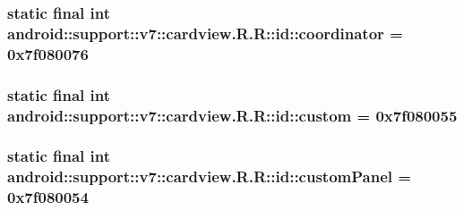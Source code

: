 \hypertarget{classandroid_1_1support_1_1v7_1_1cardview_1_1_r_1_1id_79f3959773ea30c0c7591179754d365b}{
\subsubsection[{coordinator}]{\setlength{\rightskip}{0pt plus 5cm}static final int android::support::v7::cardview.R.R::id::coordinator = 0x7f080076}}
\label{classandroid_1_1support_1_1v7_1_1cardview_1_1_r_1_1id_79f3959773ea30c0c7591179754d365b}


\hypertarget{classandroid_1_1support_1_1v7_1_1cardview_1_1_r_1_1id_d5579567b25b46e70758ff102ae57378}{
\subsubsection[{custom}]{\setlength{\rightskip}{0pt plus 5cm}static final int android::support::v7::cardview.R.R::id::custom = 0x7f080055}}
\label{classandroid_1_1support_1_1v7_1_1cardview_1_1_r_1_1id_d5579567b25b46e70758ff102ae57378}


\hypertarget{classandroid_1_1support_1_1v7_1_1cardview_1_1_r_1_1id_e58f7652304b7fbdebca769edc3ba0da}{
\subsubsection[{customPanel}]{\setlength{\rightskip}{0pt plus 5cm}static final int android::support::v7::cardview.R.R::id::customPanel = 0x7f080054}}
\label{classandroid_1_1support_1_1v7_1_1cardview_1_1_r_1_1id_e58f7652304b7fbdebca769edc3ba0da}


